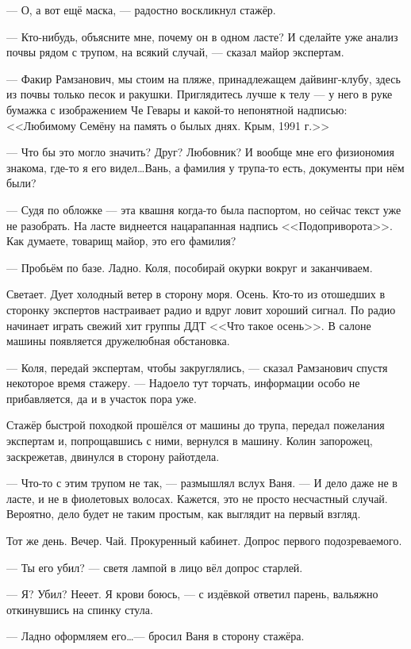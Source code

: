 --- О, а вот ещё маска, --- радостно воскликнул стажёр.

--- Кто-нибудь, объясните мне, почему он в одном ласте? И сделайте уже анализ почвы рядом с трупом, на всякий случай, --- сказал майор экспертам.

--- Факир Рамзанович, мы стоим на пляже, принадлежащем дайвинг-клубу, здесь из почвы только песок и ракушки. Приглядитесь лучше к телу --- у него в руке бумажка с изображением Че Гевары и какой-то непонятной надписью: <<Любимому Семёну на память о былых днях. Крым, 1991 г.>>

--- Что бы это могло значить? Друг? Любовник? И вообще мне его физиономия знакома, где-то я его видел\ldots Вань, а фамилия у трупа-то есть, документы при нём были?

--- Судя по обложке --- эта квашня когда-то была паспортом, но сейчас текст уже не разобрать. На ласте виднеется нацарапанная надпись <<Подоприворота>>. Как думаете, товарищ майор, это его фамилия?

--- Пробьём по базе. Ладно. Коля, пособирай окурки вокруг и заканчиваем.

Светает. Дует холодный ветер в сторону моря. Осень. Кто-то из отошедших в сторонку экспертов настраивает радио и вдруг ловит хороший сигнал. По радио начинает играть свежий хит группы ДДТ <<Что такое осень>>. В салоне машины появляется дружелюбная обстановка.

--- Коля, передай экспертам, чтобы закруглялись, --- сказал Рамзанович спустя некоторое время стажеру. --- Надоело тут торчать, информации особо не прибавляется, да и в участок пора уже.

Стажёр быстрой походкой прошёлся от машины до трупа, передал пожелания экспертам и, попрощавшись с ними, вернулся в машину. Колин запорожец, заскрежетав, двинулся в сторону райотдела.

--- Что-то с этим трупом не так, --- размышлял вслух Ваня. --- И дело даже не в ласте, и не в фиолетовых волосах. Кажется, это не просто несчастный случай. Вероятно, дело будет не таким простым, как выглядит на первый взгляд.

\asterisks

Тот же день. Вечер. Чай. Прокуренный кабинет. Допрос первого подозреваемого.

--- Ты его убил? --- светя лампой в лицо вёл допрос старлей.

--- Я? Убил? Нееет. Я крови боюсь, --- с издёвкой ответил парень, вальяжно откинувшись на спинку стула.

--- Ладно оформляем его\ldots --- бросил Ваня в сторону стажёра.

